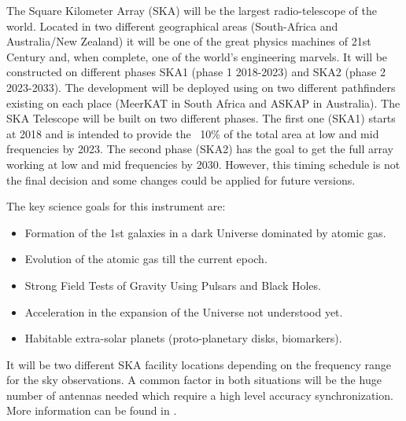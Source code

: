 The Square Kilometer Array (SKA) will be the largest radio-telescope of the 
world. Located in two different geographical areas (South-Africa and 
Australia/New Zealand) it will be one of the great physics machines of 21st 
Century and, when complete, one of the world’s engineering marvels. It will be 
constructed on different phases SKA1 (phase 1 2018-2023) and SKA2 (phase 2 
2023-2033). The development will be deployed using on two different pathfinders 
existing on each place (MeerKAT in South Africa and ASKAP in Australia). 
The SKA Telescope will be built on two different phases. The first one (SKA1)
starts at 2018 and is intended to provide the ~10\% of the total area at low and 
mid frequencies by 2023. The second phase (SKA2) has the goal to get the full
array working at low and mid frequencies by 2030. However, this timing schedule is
not the final decision and some changes could be applied for future versions.

The key science goals for this instrument are:

\begin{itemize}
	\item {Formation of the 1st galaxies in a dark Universe dominated by atomic gas.}
	\item {Evolution of the atomic gas till the current epoch.}
	\item {Strong Field Tests of Gravity Using Pulsars and Black Holes.}
	\item {Acceleration in the expansion of the Universe not understood yet.}
	\item {Habitable extra-solar planets (proto-planetary disks, biomarkers).}
\end{itemize}

It will be two different SKA facility locations depending on the frequency 
range for the sky observations. A common factor in both situations will be the 
huge number of antennas needed which require a high level accuracy 
synchronization. More information can be found in  
\cite{ska:baseline_description_v2}. 


